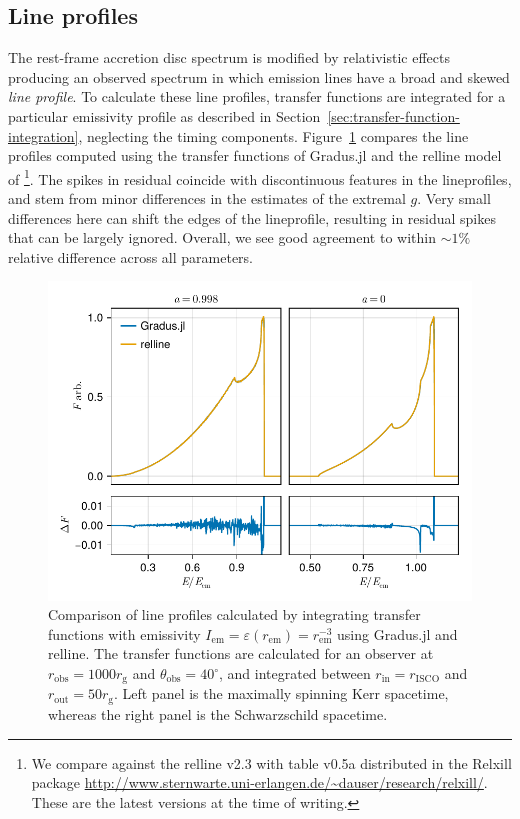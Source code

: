 \documentclass[fleqn,usenatbib]{mnras}
\newcommand{\software}[1]{{\sc #1}}
\newcommand{\Gradus}{\software{Gradus.jl}\xspace}
\newcommand{\relline}{\software{relline}\xspace}
\newcommand{\rg}{r_\text{g}}
\newcommand{\risco}{r_\text{ISCO}}
\newcommand{\rhoem}{r_\text{em}}
\begin{document}
\subsection{Line profiles}

The rest-frame accretion disc spectrum is modified by relativistic effects
producing an observed spectrum in which emission lines have a broad and skewed
\emph{line profile}.  To calculate these line profiles, transfer functions are
integrated for a particular emissivity profile as described in
Section~\ref{sec:transfer-function-integration}, neglecting the timing
components. Figure~\ref{fig:relline-comparison} compares the line profiles
computed using the transfer functions of \Gradus and the \relline model of
\cite{dauser_broad_2010}\footnote{We compare against the \relline v2.3 with
    table v0.5a distributed in the Relxill package
    \url{http://www.sternwarte.uni-erlangen.de/~dauser/research/relxill/}. These
are the latest versions at the time of writing.}. The spikes in residual
coincide with discontinuous features in the lineprofiles, and stem from minor
differences in the estimates of the extremal $g$. Very small differences here
can shift the edges of the lineprofile, resulting in residual spikes that can be
largely ignored. Overall, we see good agreement to within $\sim 1\%$ relative
difference across all parameters.

\begin{figure}
    \centering
    \includegraphics[width=0.99\columnwidth]{figures/lineprofiles.comparison.pdf}
    \caption{Comparison of line profiles calculated by integrating transfer
        functions with emissivity $I_\text{em} = \varepsilon(\rhoem) =
        \rhoem^{-3}$ using \Gradus and \relline. The transfer functions are
        calculated for an observer at $r_\text{obs} = 1000\rg$ and
        $\theta_\text{obs} = 40^\circ$, and integrated between $r_\text{in} =
        \risco$ and $r_\text{out} = 50 \rg$. Left panel is the maximally
        spinning Kerr spacetime, whereas the right panel is the Schwarzschild
        spacetime.}
    \label{fig:relline-comparison}
\end{figure}
\end{document}
